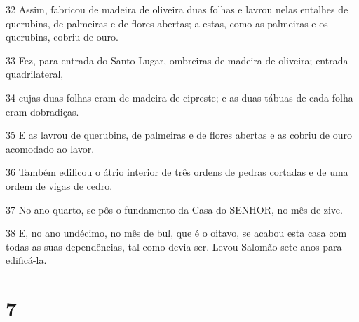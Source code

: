 \par 32 Assim, fabricou de madeira de oliveira duas folhas e lavrou nelas entalhes de querubins, de palmeiras e de flores abertas; a estas, como as palmeiras e os querubins, cobriu de ouro.
\par 33 Fez, para entrada do Santo Lugar, ombreiras de madeira de oliveira; entrada quadrilateral,
\par 34 cujas duas folhas eram de madeira de cipreste; e as duas tábuas de cada folha eram dobradiças.
\par 35 E as lavrou de querubins, de palmeiras e de flores abertas e as cobriu de ouro acomodado ao lavor.
\par 36 Também edificou o átrio interior de três ordens de pedras cortadas e de uma ordem de vigas de cedro.
\par 37 No ano quarto, se pôs o fundamento da Casa do SENHOR, no mês de zive.
\par 38 E, no ano undécimo, no mês de bul, que é o oitavo, se acabou esta casa com todas as suas dependências, tal como devia ser. Levou Salomão sete anos para edificá-la.

\chapter{7}

